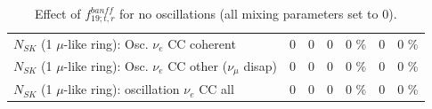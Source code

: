 \begin{table}
\begin{tabular}{| l | r | r | r  r | r  r |}
                          $N_{SK}$ (1 $\mu$-like ring): Osc. $\nu_e$ CC coherent &               0 &               0 &               0 &        0 \%  &               0 &        0 \%  \\ 
           $N_{SK}$ (1 $\mu$-like ring): Osc. $\nu_e$ CC other ($\nu_\mu$ disap) &               0 &               0 &               0 &        0 \%  &               0 &        0 \%  \\ 
                        $N_{SK}$ (1 $\mu$-like ring): oscillation $\nu_e$ CC all &               0 &               0 &               0 &        0 \%  &               0 &        0 \%  \\ 
\hline
\hline
\end{tabular}
\caption{ Effect of $f_{19; t, r}^{banff}$ for no oscillations (all mixing parameters set to 0). }
\label{tab:num_banff_ccqeE1_1RmuT_3f_osc_t13:0}
\end{table}
\clearpage

